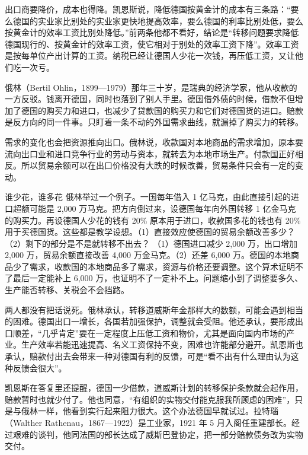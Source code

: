 出口商要降价，成本也得降。凯恩斯说，降低德国按黄金计的成本有三条路：“要么德国的实业家比别处的实业家更快地提高效率，要么德国的利率比别处低，要么按黄金计的效率工资比别处降低。”前两条他都不看好，结论是“转移问题要求降低德国现行的、按黄金计的效率工资，使它相对于别处的效率工资下降”\cite{keynes1929}。效率工资是按每单位产出计算的工资。纳税已经让德国人少花一次钱，再压低工资，又让他们吃一次亏。

俄林（Bertil Ohlin，1899—1979）那年三十岁，是瑞典的经济学家，他从收款的一方反驳\cite{nobelohlin}。钱离开德国，同时也落到了别人手里。德国借外债的时候，借款不但增加了德国的购买力和进口，也减少了贷款国的购买力和它们对德国货的进口\cite{ohlin1929}。赔款是反方向的同一件事。只盯着一条不动的外国需求曲线，就漏掉了购买力的转移。

需求的变化也会把资源推向出口。俄林说，收款国对本地商品的需求增加，原本要流向出口业和进口竞争行业的劳动与资本，就转去为本地市场生产\cite{ohlin1929}。付款国正好相反。所以贸易余额可以在出口价格没有大跌的时候改善，贸易条件只会有一定的变动\cite{ohlin1929}。

\begin{example}{谁少花，谁多花}\label{ex:weimar-transfer}
俄林举过一个例子。一国每年借入 1 亿马克，由此直接引起的进口超额可能是 2,000 万马克\cite{ohlin1929}。把方向倒过来，设德国每年向外国转移 1 亿金马克的购买力。再设德国人少花的钱有 20\% 原本用于进口，收款国多花的钱也有 20\% 用于买德国货。这些都是教学设想。（1）直接效应使德国的贸易余额改善多少？（2）剩下的部分是不是就转移不出去？
\solution （1）德国进口减少 2,000 万，出口增加 2,000 万，贸易余额直接改善 4,000 万金马克。（2）还差 6,000 万。德国的本地商品少了需求，收款国的本地商品多了需求，资源与价格还要调整。这个算术证明不了最后一定能补上 6,000 万，也证明不了一定补不上。问题缩小到了调整要多久、生产能否转移、关税会不会挡路。
\end{example}

两人都没有把话说死。俄林承认，转移道威斯年金那样大的数额，可能会遇到相当的困难。德国出口一增长，各国若加强保护，调整就会受阻。他还承认，要形成出口顺差，“几乎肯定”要在一定程度上压低工资和物价，尤其是面向国内市场的产业。生产效率若能迅速提高、名义工资保持不变，困难也许能部分避开\cite{ohlin1929}。凯恩斯也承认，赔款付出去会带来一种对德国有利的反馈，可是“看不出有什么理由认为这种反馈会很大”\cite{keynes1929b}。

凯恩斯在答复里还提醒，德国一少借款，道威斯计划的转移保护条款就会起作用，赔款暂时也就少付了\cite{keynes1929b}。他也同意，“有组织的实物交付能克服我所顾虑的困难”，只是与俄林一样，他看到实行起来阻力很大\cite{keynes1929b}。这个办法德国早就试过。拉特瑙（Walther Rathenau，1867—1922）是工业家，1921 年 5 月入阁任重建部长。经过艰难的谈判，他同法国的部长达成了威斯巴登协定，把一部分赔款债务改为实物交付\cite{rathenau2003}。


